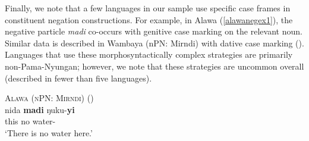\documentclass[12pt,egregdoesnotlikesansseriftitles]{scrartcl}
\begin{document}
Finally, we note that a few languages in our sample use specific case frames in constituent negation constructions. For example, in Alawa (\ref{alawanegex1}), the negative particle \textit{madi} co-occurs with genitive case marking on the relevant noun. Similar data is described in Wambaya (nPN: Mirndi) with dative case marking (\citealt[204]{nordlinger98}). Languages that use these morphosyntactically complex strategies are primarily non-Pama-Nyungan; however, we note that these strategies are uncommon overall (described in fewer than five languages).
 

\begin{exe}
  \ex \textsc{Alawa (nPN: Mirndi)} \hfill (\citealt[63]{sharpe72})\\
  \gll nida \textbf{madi} ŋuku-\textbf{yi}\\
  this  no  water-\Gen\\
  \glt `There is no water here.' \label{alawanegex1}
\end{exe}
 
\end{document}
